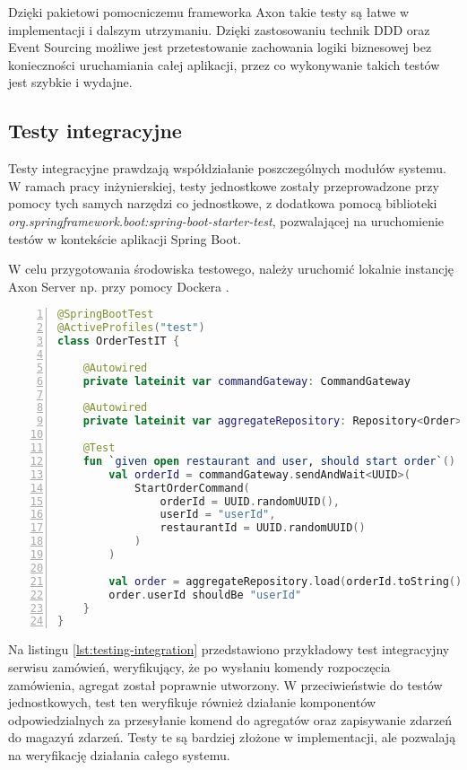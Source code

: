 Dzięki pakietowi pomocniczemu frameworka Axon takie testy są łatwe w implementacji i dalszym utrzymaniu. Dzięki zastosowaniu technik DDD oraz Event Sourcing możliwe jest przetestowanie zachowania logiki biznesowej bez konieczności uruchamiania całej aplikacji, przez co wykonywanie takich testów jest szybkie i wydajne.

\subsection{Testy integracyjne}

Testy integracyjne prawdzają współdziałanie poszczególnych modułów systemu. W ramach pracy inżynierskiej, testy jednostkowe zostały przeprowadzone przy pomocy tych samych narzędzi co jednostkowe, z dodatkowa pomocą biblioteki \textit{org.springframework.boot:spring-boot-starter-test}, pozwalającej na uruchomienie testów w kontekście aplikacji Spring Boot.

W celu przygotowania środowiska testowego, należy uruchomić lokalnie instancję Axon Server np. przy pomocy Dockera \cite{docker}.

\begin{lstlisting}[caption={Przykładowy test integracyjny serwisu zamówień},label={lst:testing-integration},captionpos=b,language=Kotlin,numbers=left]
@SpringBootTest
@ActiveProfiles("test")
class OrderTestIT {

    @Autowired
    private lateinit var commandGateway: CommandGateway

    @Autowired
    private lateinit var aggregateRepository: Repository<Order>

    @Test
    fun `given open restaurant and user, should start order`() {
        val orderId = commandGateway.sendAndWait<UUID>(
            StartOrderCommand(
                orderId = UUID.randomUUID(),
                userId = "userId",
                restaurantId = UUID.randomUUID()
            )
        )

        val order = aggregateRepository.load(orderId.toString())
        order.userId shouldBe "userId"
    }
}
\end{lstlisting}

Na listingu \ref{lst:testing-integration} przedstawiono przykładowy test integracyjny serwisu zamówień, weryfikujący, że po wysłaniu komendy rozpoczęcia zamówienia, agregat został poprawnie utworzony. W przeciwieństwie do testów jednostkowych, test ten weryfikuje również działanie komponentów odpowiedzialnych za przesyłanie komend do agregatów oraz zapisywanie zdarzeń do magazyń zdarzeń. Testy te są bardziej złożone w implementacji, ale pozwalają na weryfikację działania całego systemu.

